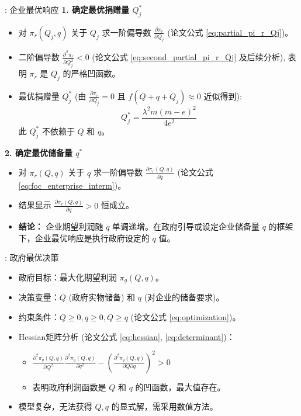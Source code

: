 \documentclass[9pt]{beamer}
\begin{document}
\begin{frame}{\insertsectionhead: 企业最优响应}
    \textbf{1. 确定最优捐赠量 $Q_j^*$}
    \begin{itemize}
        \item 对 $\pi_r(Q_j,q)$ 关于 $Q_j$ 求一阶偏导数 $\frac{\partial{\pi}_r}{\partial Q_j}$ (论文公式 \ref{eq:partial_pi_r_Qj})。
        \item 二阶偏导数 $\frac{\partial^2 {\pi}_r}{\partial Q_j^2} < 0$ (论文公式 \ref{eq:second_partial_pi_r_Qj} 及后续分析), 表明 $\pi_r$ 是 $Q_j$ 的严格凹函数。
        \item 最优捐赠量 $Q_j^*$ (由 $\frac{\partial{\pi}_r}{\partial Q_j}=0$ 且 $f(Q+q+Q_j) \approx 0$ 近似得到):
        \begin{equation} \label{eq:beamer_optimal_Qj}
        Q_j^* = \frac{\lambda^2 m (m-e)^2}{4e^2}
        \end{equation}
        此 $Q_j^*$ 不依赖于 $Q$ 和 $q$。
    \end{itemize}
    \vspace{0.5em}
    \textbf{2. 确定最优储备量 $q^*$}
    \begin{itemize}
        \item 对 $\pi_r(Q,q)$ 关于 $q$ 求一阶偏导数 $\frac{\partial \pi_r(Q,q)}{\partial q}$ (论文公式 \ref{eq:foc_enterprise_interm})。
        \item 结果显示 $\frac{\partial \pi_r(Q,q)}{\partial q} > 0$ 恒成立。
        \item \textbf{结论：} 企业期望利润随 $q$ 单调递增。在政府引导或设定企业储备量 $q$ 的框架下，企业最优响应是执行政府设定的 $q$ 值。
    \end{itemize}
\end{frame}

\begin{frame}{\insertsectionhead: 政府最优决策}
    \begin{itemize}
        \item 政府目标：最大化期望利润 $\pi_g(Q,q)$。
        \item 决策变量：$Q$ (政府实物储备) 和 $q$ (对企业的储备要求)。
        \item 约束条件：$Q \ge 0, q \ge 0, Q \ge q$ (论文公式 \ref{eq:optimization})。
        \item Hessian矩阵分析 (论文公式 \ref{eq:hessian}, \ref{eq:determinant})：
            \begin{itemize}
                \item $\frac{\partial^2 \pi_g(Q,q)}{\partial Q^2} \frac{\partial^2 \pi_g(Q,q)}{\partial q^2} - \left(\frac{\partial^2 \pi_g(Q,q)}{\partial Q\partial q}\right)^2 > 0$
                \item 表明政府利润函数是 $Q$ 和 $q$ 的凹函数，最大值存在。
            \end{itemize}
        \item 模型复杂，无法获得 $Q, q$ 的显式解，需采用数值方法。
    \end{itemize}
\end{frame}
\end{document}
